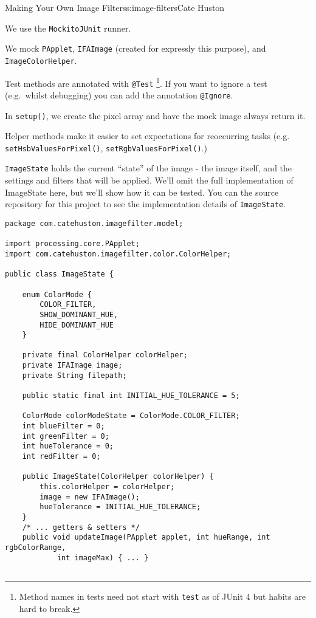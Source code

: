\begin{aosachapter}{Making Your Own Image Filters}{s:image-filters}{Cate Huston}
\begin{aosaitemize}
\item
  We use the \texttt{MockitoJUnit} runner.
\item
  We mock \texttt{PApplet}, \texttt{IFAImage} (created for expressly
  this purpose), and \texttt{ImageColorHelper}.
\item
  Test methods are annotated with \texttt{@Test} \footnote{Method names
    in tests need not start with \texttt{test} as of JUnit 4 but habits
    are hard to break.}. If you want to ignore a test (e.g.~whilst
  debugging) you can add the annotation \texttt{@Ignore}.
\item
  In \texttt{setup()}, we create the pixel array and have the mock image
  always return it.
\item
  Helper methods make it easier to set expectations for reoccurring
  tasks (e.g. \texttt{setHsbValuesForPixel()},
  \texttt{setRgbValuesForPixel()}.)
\end{aosaitemize}

\label{image-state-and-associated-tests}

\texttt{ImageState} holds the current ``state'' of the image - the image
itself, and the settings and filters that will be applied. We'll omit
the full implementation of ImageState here, but we'll show how it can be
tested. You can the source repository for this project to see the
implementation details of \texttt{ImageState}.

\begin{verbatim}
package com.catehuston.imagefilter.model;

import processing.core.PApplet;
import com.catehuston.imagefilter.color.ColorHelper;

public class ImageState {

    enum ColorMode {
        COLOR_FILTER,
        SHOW_DOMINANT_HUE,
        HIDE_DOMINANT_HUE
    }

    private final ColorHelper colorHelper;
    private IFAImage image;
    private String filepath;

    public static final int INITIAL_HUE_TOLERANCE = 5;

    ColorMode colorModeState = ColorMode.COLOR_FILTER;
    int blueFilter = 0;
    int greenFilter = 0;
    int hueTolerance = 0;
    int redFilter = 0;

    public ImageState(ColorHelper colorHelper) {
        this.colorHelper = colorHelper;
        image = new IFAImage();
        hueTolerance = INITIAL_HUE_TOLERANCE;
    }
    /* ... getters & setters */
    public void updateImage(PApplet applet, int hueRange, int rgbColorRange, 
            int imageMax) { ... }


\end{verbatim}
\end{aosachapter}
